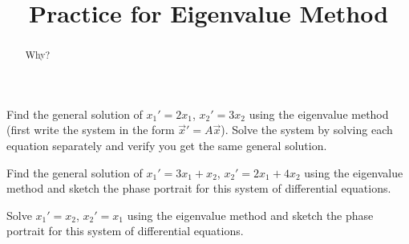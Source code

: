 \documentclass{ximera}
\title{Practice for Eigenvalue Method}
\begin{document}
\begin{abstract}
Why?
\end{abstract}
\maketitle


\begin{exercise}
    \begin{tasks}
        \task Find the general solution of $x_1' = 2 x_1$, $x_2' = 3 x_2$ using the eigenvalue method (first write the system in the form ${\vec{x}}' = A \vec{x}$).
        \task Solve the system by solving each equation separately and verify you get the same general solution.
    \end{tasks}
\end{exercise}

\begin{exercise}
    Find the general solution of $x_1' = 3 x_1 + x_2$, $x_2' = 2 x_1 + 4 x_2$ using the eigenvalue method and sketch the phase portrait for this system of differential equations.
\end{exercise}

\begin{exercise}%
    Solve $x_1' = x_2$, $x_2' = x_1$ using the eigenvalue method and sketch the phase portrait for this system of differential equations.
\end{exercise}
\end{document}
